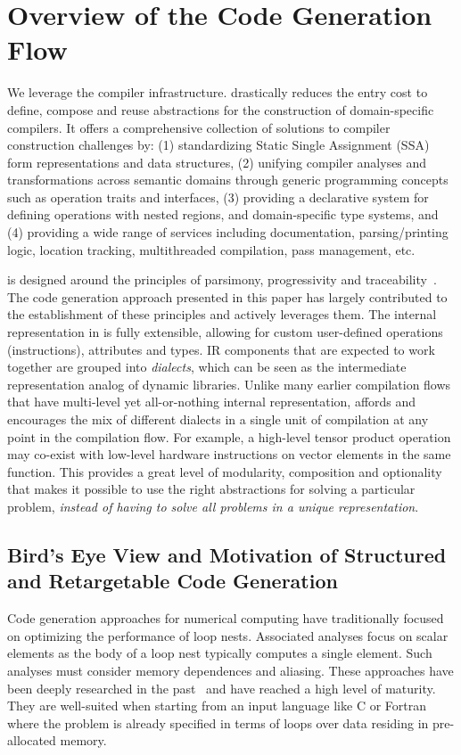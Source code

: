 \section{Overview of the Code Generation Flow}
We leverage the \MLIR compiler infrastructure.
\MLIR drastically reduces the entry cost to define, compose and reuse abstractions for the construction of domain-specific compilers.
It offers a comprehensive collection of solutions to compiler construction challenges by:
(1) standardizing Static Single Assignment (SSA) form representations and data structures,
(2) unifying compiler analyses and transformations across semantic domains through generic programming concepts such as operation traits and interfaces,
(3) providing a declarative system for defining operations with nested regions, and domain-specific type systems, and
(4) providing a wide range of services including documentation, parsing/printing logic, location tracking, multithreaded compilation, pass management, etc.

\MLIR is designed around the principles of parsimony, progressivity and traceability~\cite{lattner2021mlir}. 
The code generation approach presented in this paper has largely contributed to the establishment of these principles and actively leverages them. 
The internal representation in \MLIR is fully extensible, allowing for custom user-defined operations (instructions), attributes and types. 
IR components that are expected to work together are grouped into \emph{dialects}, which can be seen as the intermediate representation analog of dynamic libraries. 
Unlike many earlier compilation flows that have multi-level yet all-or-nothing internal representation, \MLIR affords and encourages the mix of different dialects in a single unit of compilation at any point in the compilation flow. 
For example, a high-level tensor product operation may co-exist with low-level hardware instructions on vector elements in the same function. This provides a great level of modularity, composition and optionality that makes it possible to use the right abstractions for solving a particular problem, \emph{instead of having to solve all problems in a unique  representation}.

\subsection{Bird's Eye View and Motivation of Structured and Retargetable Code Generation}

Code generation approaches for numerical computing have traditionally focused on optimizing the performance of loop nests. 
Associated analyses focus on scalar elements as the body of a loop nest typically computes a single element. 
Such analyses must consider memory dependences and aliasing. 
These approaches have been deeply researched in the past~\cite{AllenKennedy} and have reached a high level of maturity. 
They are well-suited when starting from an input language like C or Fortran where the problem is already specified in terms of loops over data residing in pre-allocated memory.

